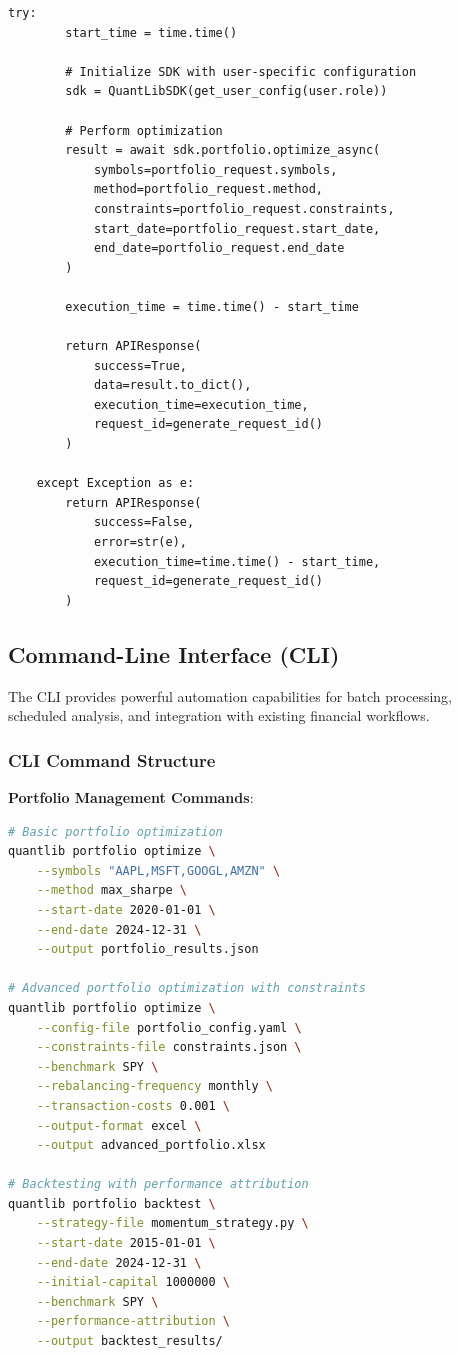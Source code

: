 \documentclass[12pt,a4paper]{article}
\theoremstyle{definition}
\theoremstyle{remark}
\begin{document}
\begin{lstlisting}[caption=API Security Implementation]
    try:
        start_time = time.time()
        
        # Initialize SDK with user-specific configuration
        sdk = QuantLibSDK(get_user_config(user.role))
        
        # Perform optimization
        result = await sdk.portfolio.optimize_async(
            symbols=portfolio_request.symbols,
            method=portfolio_request.method,
            constraints=portfolio_request.constraints,
            start_date=portfolio_request.start_date,
            end_date=portfolio_request.end_date
        )
        
        execution_time = time.time() - start_time
        
        return APIResponse(
            success=True,
            data=result.to_dict(),
            execution_time=execution_time,
            request_id=generate_request_id()
        )
        
    except Exception as e:
        return APIResponse(
            success=False,
            error=str(e),
            execution_time=time.time() - start_time,
            request_id=generate_request_id()
        )
\end{lstlisting}

\subsection{Command-Line Interface (CLI)}

The CLI provides powerful automation capabilities for batch processing, scheduled analysis, and integration with existing financial workflows.

\subsubsection{CLI Command Structure}

\textbf{Portfolio Management Commands}:
\begin{lstlisting}[language=bash,caption=CLI Portfolio Commands]
# Basic portfolio optimization
quantlib portfolio optimize \
    --symbols "AAPL,MSFT,GOOGL,AMZN" \
    --method max_sharpe \
    --start-date 2020-01-01 \
    --end-date 2024-12-31 \
    --output portfolio_results.json

# Advanced portfolio optimization with constraints
quantlib portfolio optimize \
    --config-file portfolio_config.yaml \
    --constraints-file constraints.json \
    --benchmark SPY \
    --rebalancing-frequency monthly \
    --transaction-costs 0.001 \
    --output-format excel \
    --output advanced_portfolio.xlsx

# Backtesting with performance attribution
quantlib portfolio backtest \
    --strategy-file momentum_strategy.py \
    --start-date 2015-01-01 \
    --end-date 2024-12-31 \
    --initial-capital 1000000 \
    --benchmark SPY \
    --performance-attribution \
    --output backtest_results/
\end{lstlisting}
\end{document}
